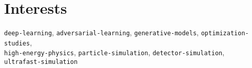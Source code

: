 \newcommand{\topic}[1]{{\texttt{#1}}}

\section*{Interests}
\begin{cvcontent}
  \topic{deep-learning},
  \topic{adversarial-learning},
  \topic{generative-models},
  \topic{optimization-studies},\\
  \topic{high-energy-physics},
  \topic{particle-simulation},
  \topic{detector-simulation},
  \topic{ultrafast-simulation}
\end{cvcontent}
